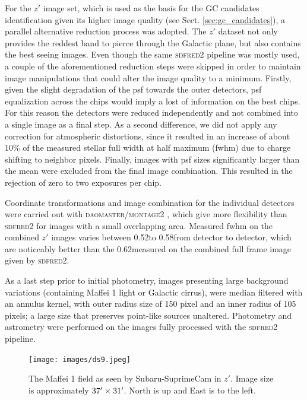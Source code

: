\documentclass[useAMS,usenatbib]{mn2e}
\begin{document}
For the $z'$ image set, which is used as the basis for the GC
candidates identification given its higher image quality (see
Sect. \ref{sec:gc_candidates}), a parallel alternative reduction
process was adopted. The $z'$ dataset not only provides the reddest
band to pierce through the Galactic plane, but also contains the best
seeing images. Even though the same \textsc{sdfred2} pipeline was
mostly used, a couple of the aforementioned reduction steps were
skipped in order to maintain image manipulations that could alter the
image quality to a minimum. Firstly, given the slight degradation of
the psf towards the outer detectors, psf equalization across the chips
would imply a lost of information on the best chips. For this reason
the detectors were reduced independently and not combined into a
single image as a final step. As a second difference, we did not apply
any correction for atmospheric distortions, since it resulted in an
increase of about 10\% of the measured stellar full width at half
maximum (fwhm) due to charge shifting to neighbor pixels. Finally,
images with psf sizes significantly larger than the mean were excluded
from the final image combination. This resulted in the rejection of
zero to two exposures per chip.

Coordinate transformations and image combination for the individual
detectors were carried out with \textsc{daomaster/montage2}
\citep{stetson93,stetson94}, which give more flexibility than
\textsc{sdfred2} for images with a small overlapping area. Measured
fwhm on the combined $z'$ images varies between 0.52\arcsec to
0.58\arcsec from detector to detector, which are noticeably better
than the 0.62\arcsec measured on the combined full frame image given
by \textsc{sdfred2}.

As a last step prior to initial photometry, images presenting large background
variations (containing Maffei 1 light or Galactic cirrus), were
median filtered with an annulus kernel, with outer radius size of 150 pixel and an inner radius of 105 pixels; a large size that preserves point-like sources unaltered. Photometry and astrometry were performed on the images fully processed with the \textsc{sdfred2} pipeline.

\begin{figure}
\texttt{[image: images/ds9.jpeg]}
\caption{The Maffei 1 field as seen by Subaru-SuprimeCam in $z'$. Image size
  is approximately $37\hbox{$^\prime$}\times 31\hbox{$^\prime$}$. North is up and East is
  to the left.}
\label{fig:maffei1}
\end{figure}
\end{document}
